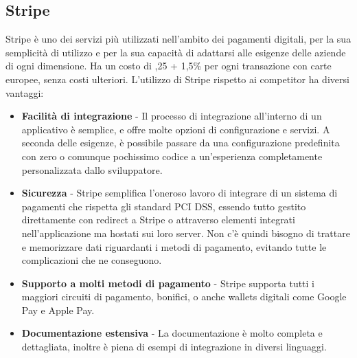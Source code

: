 \subsection{Stripe}
Stripe \`e uno dei servizi pi\`u utilizzati nell'ambito dei pagamenti digitali, per la sua semplicit\`a di utilizzo e per la sua capacit\`a di adattarsi alle esigenze delle aziende
di ogni dimensione. Ha un costo di ,25 + 1,5\% per ogni transazione con carte europee, senza costi ulteriori.
L'utilizzo di Stripe rispetto ai competitor ha diversi vantaggi:
\begin{itemize}
  \item \textbf{Facilit\`a di integrazione} - Il processo di integrazione all'interno di un applicativo \`e semplice, e offre molte opzioni di configurazione e servizi.
    A seconda delle esigenze, \`e possibile passare da una configurazione predefinita con zero o comunque pochissimo codice a un'esperienza completamente personalizzata dallo sviluppatore.
  \item \textbf{Sicurezza} - Stripe semplifica l'oneroso lavoro di integrare di un sistema di pagamenti che rispetta gli standard PCI DSS, essendo tutto gestito
    direttamente con redirect a Stripe o attraverso elementi integrati nell'applicazione ma hostati sui loro server. Non c'\`e quindi bisogno di trattare e memorizzare dati
    riguardanti i metodi di pagamento, evitando tutte le complicazioni che ne conseguono.
  \item \textbf{Supporto a molti metodi di pagamento} - Stripe supporta tutti i maggiori circuiti di pagamento, bonifici, o anche wallets digitali come Google Pay e Apple Pay.
  \item \textbf{Documentazione estensiva} - La documentazione \`e molto completa e dettagliata, inoltre \`e piena di esempi di integrazione in diversi linguaggi.
\end{itemize}
